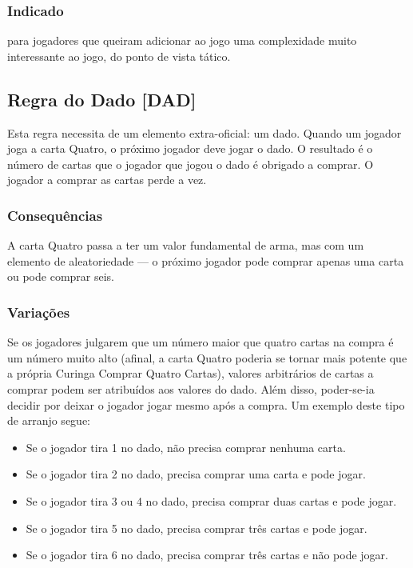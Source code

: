 \subsubsection{Indicado} 

para jogadores que queiram adicionar ao jogo uma complexidade muito interessante ao jogo, do ponto de vista tático.

\subsection{Regra do Dado [DAD]}

Esta regra necessita de um elemento extra-oficial: um dado. Quando um jogador joga a carta Quatro, o próximo jogador deve jogar o dado. O resultado é o número de cartas que o jogador que jogou o dado é obrigado a comprar. O jogador a comprar as cartas perde a vez.

\subsubsection{Consequências}

A carta Quatro passa a ter um valor fundamental de arma, mas com um elemento de aleatoriedade --- o próximo jogador pode comprar apenas uma carta ou pode comprar seis.

\subsubsection{Variações}

Se os jogadores julgarem que um número maior que quatro cartas na compra é um número muito alto (afinal, a carta Quatro poderia se tornar mais potente que a própria Curinga Comprar Quatro Cartas), valores arbitrários de cartas a comprar podem ser atribuídos aos valores do dado. Além disso, poder-se-ia decidir por deixar o jogador jogar mesmo após a compra. Um exemplo deste tipo de arranjo segue:

\begin{itemize}
\item{Se o jogador tira 1 no dado, não precisa comprar nenhuma carta.}
\item{Se o jogador tira 2 no dado, precisa comprar uma carta e pode jogar.}
\item{Se o jogador tira 3 ou 4 no dado, precisa comprar duas cartas e pode jogar.}
\item{Se o jogador tira 5 no dado, precisa comprar três cartas e pode jogar.}
\item{Se o jogador tira 6 no dado, precisa comprar três cartas e não pode jogar.}
\end{itemize}

